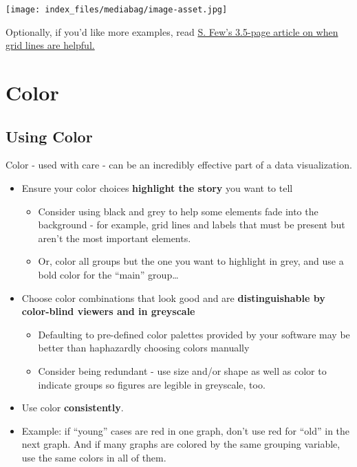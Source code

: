 \documentclass[
  letterpaper,
  DIV=11,
  numbers=noendperiod]{scrreprt}
\providecommand{\tightlist}{%
  \setlength{\itemsep}{0pt}\setlength{\parskip}{0pt}}\usepackage{longtable,booktabs,array}
\theoremstyle{remark}
\begin{document}
\texttt{[image: index\_files/mediabag/image-asset.jpg]}

Optionally, if you'd like more examples, read
\href{http://www.perceptualedge.com/articles/dmreview/grid_lines.pdf}{S.
Few's 3.5-page article on when grid lines are helpful.}

\chapter{Color}\label{color}

\section{Using Color}\label{using-color}

Color - used with care - can be an incredibly effective part of a data
visualization.

\begin{itemize}
\tightlist
\item
  Ensure your color choices \textbf{highlight the story} you want to
  tell

  \begin{itemize}
  \tightlist
  \item
    Consider using black and grey to help some elements fade into the
    background - for example, grid lines and labels that must be present
    but aren't the most important elements.
  \item
    Or, color all groups but the one you want to highlight in grey, and
    use a bold color for the ``main'' group\ldots{}
  \end{itemize}
\item
  Choose color combinations that look good and are
  \textbf{distinguishable by color-blind viewers and in greyscale}

  \begin{itemize}
  \tightlist
  \item
    Defaulting to pre-defined color palettes provided by your software
    may be better than haphazardly choosing colors manually
  \item
    Consider being redundant - use size and/or shape as well as color to
    indicate groups so figures are legible in greyscale, too.
  \end{itemize}
\item
  Use color \textbf{consistently}.
\item
  Example: if ``young'' cases are red in one graph, don't use red for
  ``old'' in the next graph. And if many graphs are colored by the same
  grouping variable, use the same colors in all of them.
\end{itemize}
\end{document}
